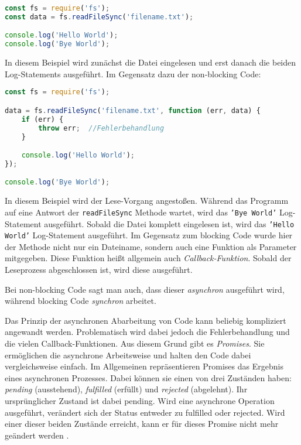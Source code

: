  \begin{lstlisting}[title=Blocking Code bei dem Einlesen einer Datei, language=JavaScript]
const fs = require('fs');
const data = fs.readFileSync('filename.txt');

console.log('Hello World');
console.log('Bye World');
\end{lstlisting}

In diesem Beispiel wird zunächst die Datei eingelesen und erst danach die beiden Log-Statements ausgeführt. Im Gegensatz dazu der non-blocking Code: \\

\noindent
\begin{minipage}{\linewidth}
\begin{lstlisting}[title=Non-blocking Code beim Einlesen einer Datei, language=JavaScript]
const fs = require('fs');

data = fs.readFileSync('filename.txt', function (err, data) {
	if (err) {
		throw err;  //Fehlerbehandlung
	}

	console.log('Hello World');
});

console.log('Bye World');

\end{lstlisting}
\end{minipage}

In diesem Beispiel wird der Lese-Vorgang angestoßen. Während das Programm auf eine Antwort der \texttt{readFileSync} Methode wartet, wird das \texttt{'Bye World'} Log-Statement ausgeführt. Sobald die Datei komplett eingelesen ist, wird das \texttt{'Hello World'} Log-Statement ausgeführt. Im Gegensatz zum blocking Code wurde hier der Methode nicht nur ein Dateiname, sondern auch eine Funktion als Parameter mitgegeben. Diese Funktion heißt allgemein auch \textit{Callback-Funktion}. Sobald der Leseprozess abgeschlossen ist, wird diese ausgeführt.

Bei non-blocking Code sagt man auch, dass dieser \textit{asynchron} ausgeführt wird, während blocking Code \textit{synchron} arbeitet.

Das Prinzip der asynchronen Abarbeitung von Code kann beliebig kompliziert angewandt werden. Problematisch wird dabei jedoch die Fehlerbehandlung und die vielen Callback-Funktionen. Aus diesem Grund gibt es \textit{Promises}. Sie ermöglichen die asynchrone Arbeitsweise und halten den Code dabei vergleichsweise einfach. Im Allgemeinen repräsentieren Promises das Ergebnis eines asynchronen Prozesses. Dabei können sie einen von drei Zuständen haben: \textit{pending} (ausstehend), \textit{fulfilled} (erfüllt) und \textit{rejected} (abgelehnt). Ihr ursprünglicher Zustand ist dabei pending. Wird eine asynchrone Operation ausgeführt, verändert sich der Status entweder zu fulfilled oder rejected. Wird einer dieser beiden Zustände erreicht, kann er für dieses Promise nicht mehr geändert werden \cite{prom}.


